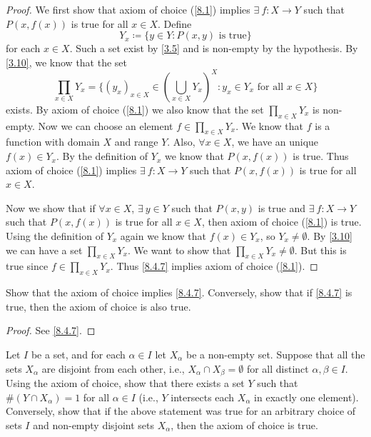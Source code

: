 \begin{proof}
  We first show that axiom of choice (\cref{8.1}) implies \(\exists\ f : X \to Y\) such that \(P(x, f(x))\) is true for all \(x \in X\).
  Define
  \[
    Y_x \coloneqq \{y \in Y : P(x, y) \text{ is true}\}
  \]
  for each \(x \in X\).
  Such a set exist by \cref{3.5} and is non-empty by the hypothesis.
  By \cref{3.10}, we know that the set
  \[
    \prod_{x \in X} Y_x = \Bigg\{(y_x)_{x \in X} \in (\bigcup_{x \in X} Y_x)^X : y_x \in Y_x \text{ for all } x \in X\Bigg\}
  \]
  exists.
  By axiom of choice (\cref{8.1}) we also know that the set \(\prod_{x \in X} Y_x\) is non-empty.
  Now we can choose an element \(f \in \prod_{x \in X} Y_x\).
  We know that \(f\) is a function with domain \(X\) and range \(Y\).
  Also, \(\forall x \in X\), we have an unique \(f(x) \in Y_x\).
  By the definition of \(Y_x\) we know that \(P(x, f(x))\) is true.
  Thus axiom of choice (\cref{8.1}) implies \(\exists\ f : X \to Y\) such that \(P(x, f(x))\) is true for all \(x \in X\).

  Now we show that if \(\forall x \in X\), \(\exists\ y \in Y\) such that \(P(x, y)\) is true and \(\exists\ f : X \to Y\) such that \(P(x, f(x))\) is true for all \(x \in X\), then axiom of choice (\cref{8.1}) is true.
  Using the definition of \(Y_x\) again we know that \(f(x) \in Y_x\), so \(Y_x \neq \emptyset\).
  By \cref{3.10} we can have a set \(\prod_{x \in X} Y_x\).
  We want to show that \(\prod_{x \in X} Y_x \neq \emptyset\).
  But this is true since \(f \in \prod_{x \in X} Y_x\).
  Thus \cref{8.4.7} implies axiom of choice (\cref{8.1}).
\end{proof}

\exercisesection

\begin{ex}\label{ex:8.4.1}
  Show that the axiom of choice implies \cref{8.4.7}.
  Conversely, show that if \cref{8.4.7} is true, then the axiom of choice is also true.
\end{ex}

\begin{proof}
  See \cref{8.4.7}.
\end{proof}

\begin{ex}\label{ex:8.4.2}
  Let \(I\) be a set, and for each \(\alpha \in I\) let \(X_{\alpha}\) be a non-empty set.
  Suppose that all the sets \(X_{\alpha}\) are disjoint from each other, i.e., \(X_{\alpha} \cap X_{\beta} = \emptyset\) for all distinct \(\alpha, \beta \in I\).
  Using the axiom of choice, show that there exists a set \(Y\) such that \(\#(Y \cap X_{\alpha}) = 1\) for all \(\alpha \in I\) (i.e., \(Y\) intersects each \(X_{\alpha}\) in exactly one element).
  Conversely, show that if the above statement was true for an arbitrary choice of sets \(I\) and non-empty disjoint sets \(X_{\alpha}\), then the axiom of choice is true.
\end{ex}

